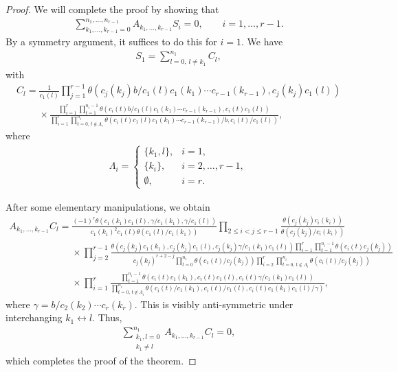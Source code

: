 \begin{proof}
We will complete the proof by showing that
\begin{gather*}\sum_{k_1,\dots,k_{r-1}=0}^{n_1,\dots,n_{r-1}}A_{k_1,\dots,k_{r-1}}
S_i=0,\qquad i=1,\dots,r-1.\end{gather*}
 By a symmetry argument, it suffices to do this for $i=1$.
We have
\begin{gather*}S_1=\sum_{l=0,\,l\neq k_1}^{n_1}C_l, \end{gather*}
with
\begin{gather*}
C_l=
\frac{1}{c_1(l)}
\prod\limits_{j=1}^{r-1}\theta(c_j(k_j)b/c_1(l)c_1(k_1)\dotsm
 c_{r-1}(k_{r-1}),
 c_j(k_j)c_1(l))
 \\ \phantom{C_l=}{}
\times\frac{\prod\limits_{i=1}^r\prod\limits_{t=1}^{n_i-1}\theta
(c_i(t)b/c_1(l)c_1(k_1)\dotsm
 c_{r-1}(k_{r-1}),c_i(t)c_1(l))}
{\prod\limits_{i=1}^{r}\prod\limits_{t=0,\,t\notin \Lambda_i}^{n_i}
\theta(c_i(t)c_1(l) c_1(k_1)\dotsm
 c_{r-1}(k_{r-1})/b,c_i(t)/c_1(l))},
\end{gather*}
where
\begin{gather*}
\Lambda_i=
\begin{cases}\{k_1,l\}, & i=1,\\ \{k_i\}, &
 i=2,\dots,r-1,\\ \emptyset, & i=r.
\end{cases}
\end{gather*}

After some elementary manipulations, we obtain
\begin{gather*}
A_{k_1,\dots,k_{r-1}}C_{l}=
\frac{(-1)^r\theta(c_1(k_1)c_1(l),\gamma/c_1(k_1),
\gamma/c_1(l))}{c_1(k_1)^2c_1(l) \theta(c_1(l)/c_1(k_1))}
\prod\limits_{2\leq i<j\leq
 r-1}\frac{\theta(c_j(k_j)c_i(k_i))}{\theta(c_j(k_j)/c_i(k_i))}
 \\ \phantom{A_{k_1,\dots,k_{r-1}}C_{l}=}{}
\times\prod\limits_{j=2}^{r-1}\frac{\theta(c_j(k_j)c_1(k_1),c_j(k_j)c_1(l),c_j(k_j)\gamma/
c_1(k_1)c_1(l))\prod\limits_{i=1}^r\prod\limits_{t=1}^{n_i-1}
\theta(c_i(t)c_j(k_j))}{c_j(k_j)^{r+2-j}
\prod\limits_{t=0}^{n_1}\theta(c_1(t)/c_j(k_j))\prod\limits_{i=2}^{r}\prod\limits_{t=0,\,t\notin
 \Lambda_i}^{n_i}\theta(c_i(t)/c_j(k_j))}
 \\ \phantom{A_{k_1,\dots,k_{r-1}}C_{l}=}{}
\times\prod\limits_{i=1}^r\frac{\prod\limits_{t=1}^{n_i-1}
\theta(c_i(t)c_1(k_1),c_i(t)c_1(l),c_i(t)\gamma/c_1(k_1)c_1(l))}
{\prod\limits_{t=0,\,t\notin \Lambda_i}^{n_i}
\theta(c_i(t)/c_1(k_1),c_i(t)/c_1(l),c_i(t)c_1(k_1)c_1(l)/\gamma)},
\end{gather*}
where $\gamma=b/c_2(k_2)\dotsm c_r(k_r)$.
This is visibly anti-symmetric under interchanging
$k_1\leftrightarrow l$. Thus,
\begin{gather*}
\sum_{\substack{k_1,l=0\\k_1\neq l}}^{n_1}A_{k_1,\dots,k_{r-1}}C_{l}=0,
\end{gather*}
which completes the proof of the theorem.
\end{proof}
